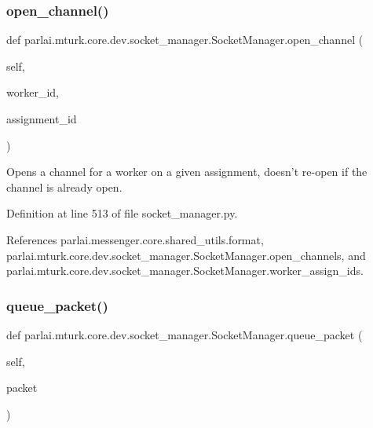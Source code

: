 \subsubsection{\texorpdfstring{open\+\_\+channel()}{open\_channel()}}
{\footnotesize\ttfamily def parlai.\+mturk.\+core.\+dev.\+socket\+\_\+manager.\+Socket\+Manager.\+open\+\_\+channel (\begin{DoxyParamCaption}\item[{}]{self,  }\item[{}]{worker\+\_\+id,  }\item[{}]{assignment\+\_\+id }\end{DoxyParamCaption})}

\begin{DoxyVerb}Opens a channel for a worker on a given assignment, doesn't re-open
if the channel is already open.\end{DoxyVerb}
 

Definition at line 513 of file socket\+\_\+manager.\+py.



References parlai.\+messenger.\+core.\+shared\+\_\+utils.\+format, parlai.\+mturk.\+core.\+dev.\+socket\+\_\+manager.\+Socket\+Manager.\+open\+\_\+channels, and parlai.\+mturk.\+core.\+dev.\+socket\+\_\+manager.\+Socket\+Manager.\+worker\+\_\+assign\+\_\+ids.

\mbox{\label{classparlai_1_1mturk_1_1core_1_1dev_1_1socket__manager_1_1SocketManager_ac22bce0f2227feb7d76132fe565e11da}} 
\subsubsection{\texorpdfstring{queue\+\_\+packet()}{queue\_packet()}}
{\footnotesize\ttfamily def parlai.\+mturk.\+core.\+dev.\+socket\+\_\+manager.\+Socket\+Manager.\+queue\+\_\+packet (\begin{DoxyParamCaption}\item[{}]{self,  }\item[{}]{packet }\end{DoxyParamCaption})}

